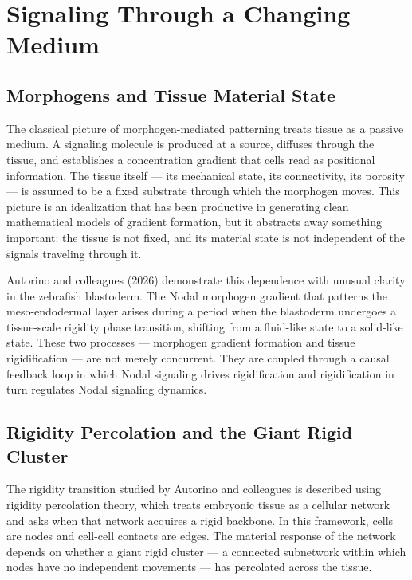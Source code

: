 \documentclass[12pt, a4paper, openany]{book}
\theoremstyle{definition}
\theoremstyle{remark}
\begin{document}

\chapter{Signaling Through a Changing Medium}

\section{Morphogens and Tissue Material State}

The classical picture of morphogen-mediated patterning treats tissue as a passive medium. A signaling molecule is produced at a source, diffuses through the tissue, and establishes a concentration gradient that cells read as positional information. The tissue itself — its mechanical state, its connectivity, its porosity — is assumed to be a fixed substrate through which the morphogen moves. This picture is an idealization that has been productive in generating clean mathematical models of gradient formation, but it abstracts away something important: the tissue is not fixed, and its material state is not independent of the signals traveling through it.

Autorino and colleagues (2026) demonstrate this dependence with unusual clarity in the zebrafish blastoderm. The Nodal morphogen gradient that patterns the meso-endodermal layer arises during a period when the blastoderm undergoes a tissue-scale rigidity phase transition, shifting from a fluid-like state to a solid-like state. These two processes — morphogen gradient formation and tissue rigidification — are not merely concurrent. They are coupled through a causal feedback loop in which Nodal signaling drives rigidification and rigidification in turn regulates Nodal signaling dynamics.

\section{Rigidity Percolation and the Giant Rigid Cluster}

The rigidity transition studied by Autorino and colleagues is described using rigidity percolation theory, which treats embryonic tissue as a cellular network and asks when that network acquires a rigid backbone. In this framework, cells are nodes and cell-cell contacts are edges. The material response of the network depends on whether a giant rigid cluster — a connected subnetwork within which nodes have no independent movements — has percolated across the tissue.
\end{document}
